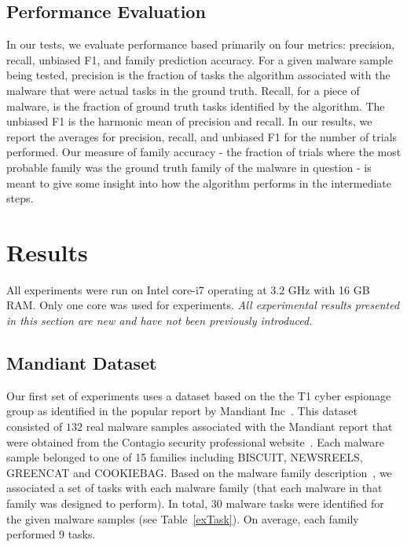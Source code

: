 \documentclass[conference]{IEEEtran}
\begin{document}
\subsection{Performance Evaluation}
In our tests, we evaluate performance based primarily on four metrics: precision, recall, unbiased F1, and family prediction accuracy.  For a given malware sample being tested, precision is the fraction of tasks the algorithm associated with the malware that were actual tasks in the ground truth.  Recall, for a piece of malware, is the fraction of ground truth tasks identified by the algorithm.  The unbiased F1 is the harmonic mean of precision and recall.  In our results, we report the averages for precision, recall, and unbiased F1 for the number of trials performed.  Our measure of family accuracy - the fraction of trials where the most probable family was the ground truth family of the malware in question - is meant to give some insight into how the algorithm performs in the intermediate steps.

\section{Results}
\noindent All experiments were run on Intel core-i7 operating at 3.2 GHz with 16 GB RAM. Only one core was used for experiments. \textit{All experimental results presented in this section are new and have not been previously introduced.}
\label{expSec}
\subsection{Mandiant Dataset}
Our first set of experiments uses a dataset based on the the T1 cyber espionage group as identified in the popular report by Mandiant Inc~\cite{mandiant}.  This dataset consisted of $132$ real malware samples associated with the Mandiant report that were obtained from the Contagio security professional website~\cite{apt1sams}.  Each malware sample belonged to one of 15 families including BISCUIT, NEWSREELS, GREENCAT and COOKIEBAG. Based on the malware family description~\cite{mandiant}, we associated a set of tasks with each malware family (that each malware in that family was designed to perform). In total, 30 malware tasks were identified for the given malware samples (see Table~\ref{exTask}). On average, each family performed 9 tasks.
\end{document}
